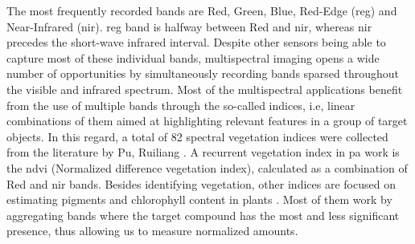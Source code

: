 The most frequently recorded bands are Red, Green, Blue, Red-Edge (\acrshort{reg}) and Near-Infrared (\acrshort{nir}). \acrshort{reg} band is halfway between Red and \acrshort{nir}, whereas \acrshort{nir} precedes the short-wave infrared interval. Despite other sensors being able to capture most of these individual bands, multispectral imaging opens a wide number of opportunities by simultaneously recording bands sparsed throughout the visible and infrared spectrum. Most of the multispectral applications benefit from the use of multiple bands through the so-called indices, i.e, linear combinations of them aimed at highlighting relevant features in a group of target objects. In this regard, a total of 82 spectral vegetation indices were collected from the literature by Pu, Ruiliang \cite{pu_hyperspectral_2017}. A recurrent vegetation index in \acrshort{pa} work is the \acrshort{ndvi} (Normalized difference vegetation index), calculated as a combination of Red and \acrshort{nir} bands. Besides identifying vegetation, other indices are focused on estimating pigments and chlorophyll content in plants \cite{pu_hyperspectral_2017}. Most of them work by aggregating bands where the target compound has the most and less significant presence, thus allowing us to measure normalized amounts.


